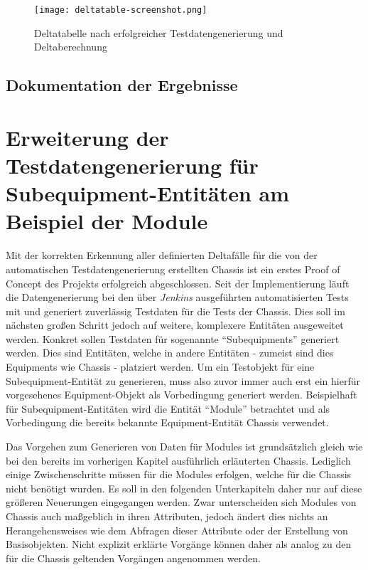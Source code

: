 \begin{figure}[h]
    \centering
    \texttt{[image: deltatable-screenshot.png]}
    \caption{Deltatabelle nach erfolgreicher Testdatengenerierung und Deltaberechnung}
\end{figure}

\subsection{Dokumentation der Ergebnisse}\label{subsec:documentationChassis}

\section{Erweiterung der Testdatengenerierung für Subequipment-Entitäten am Beispiel der Module}\label{sec:tdgmodule}
Mit der korrekten Erkennung aller definierten Deltafälle für die von der automatischen Testdatengenerierung erstellten Chassis ist ein erstes Proof of Concept des Projekts erfolgreich abgeschlossen. Seit der Implementierung läuft die Datengenerierung bei den über \textit{Jenkins} ausgeführten automatisierten Tests mit und generiert zuverlässig Testdaten für die Tests der Chassis. Dies soll im nächsten großen Schritt jedoch auf weitere, komplexere Entitäten ausgeweitet werden. Konkret sollen Testdaten für sogenannte \enquote{Subequipments} generiert werden. Dies sind Entitäten, welche in andere Entitäten - zumeist sind dies Equipments wie Chassis - platziert werden. Um ein Testobjekt für eine Subequipment-Entität zu generieren, muss also zuvor immer auch erst ein hierfür vorgesehenes Equipment-Objekt als Vorbedingung generiert werden. Beispielhaft für Subequipment-Entitäten wird die Entität \enquote{Module} betrachtet und als Vorbedingung die bereits bekannte Equipment-Entität Chassis verwendet.

Das Vorgehen zum Generieren von Daten für Modules ist grundsätzlich gleich wie bei den bereits im vorherigen Kapitel ausführlich erläuterten Chassis. Lediglich einige Zwischenschritte müssen für die Modules erfolgen, welche für die Chassis nicht benötigt wurden. Es soll in den folgenden Unterkapiteln daher nur auf diese größeren Neuerungen eingegangen werden. Zwar unterscheiden sich Modules von Chassis auch maßgeblich in ihren Attributen, jedoch ändert dies nichts an Herangehensweises wie dem Abfragen dieser Attribute oder der Erstellung von Basisobjekten. Nicht explizit erklärte Vorgänge können daher als analog zu den für die Chassis geltenden Vorgängen angenommen werden.

